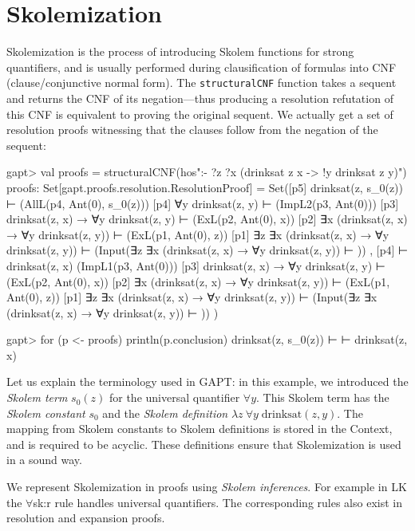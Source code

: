 \documentclass[a4paper,11pt]{book}
\begin{document}
\section{Skolemization}\label{secskolem}

Skolemization is the process of introducing Skolem functions for strong
quantifiers, and is usually performed during clausification of formulas into
CNF (clause/conjunctive normal form).  The \texttt{structuralCNF} function
takes a sequent and returns the CNF of its negation---thus producing a
resolution refutation of this CNF is equivalent to proving the original
sequent.  We actually get a set of resolution proofs witnessing that the
clauses follow from the negation of the sequent:
\begin{clilisting}
gapt> val proofs = structuralCNF(hos":- ?z ?x (drinksat z x -> !y drinksat z y)")
proofs: Set[gapt.proofs.resolution.ResolutionProof] =
Set([p5] drinksat(z, s_0(z)) ⊢    (AllL(p4, Ant(0), s_0(z)))
[p4] ∀y drinksat(z, y) ⊢    (ImpL2(p3, Ant(0)))
[p3] drinksat(z, x) → ∀y drinksat(z, y) ⊢    (ExL(p2, Ant(0), x))
[p2] ∃x (drinksat(z, x) → ∀y drinksat(z, y)) ⊢    (ExL(p1, Ant(0), z))
[p1] ∃z ∃x (drinksat(z, x) → ∀y drinksat(z, y)) ⊢    (Input(∃z ∃x (drinksat(z, x) → ∀y drinksat(z, y)) ⊢ ))
, [p4]  ⊢ drinksat(z, x)   (ImpL1(p3, Ant(0)))
[p3] drinksat(z, x) → ∀y drinksat(z, y) ⊢    (ExL(p2, Ant(0), x))
[p2] ∃x (drinksat(z, x) → ∀y drinksat(z, y)) ⊢    (ExL(p1, Ant(0), z))
[p1] ∃z ∃x (drinksat(z, x) → ∀y drinksat(z, y)) ⊢    (Input(∃z ∃x (drinksat(z, x) → ∀y drinksat(z, y)) ⊢ ))
)

gapt> for (p <- proofs) println(p.conclusion)
drinksat(z, s_0(z)) ⊢ 
 ⊢ drinksat(z, x)

\end{clilisting}

Let us explain the terminology used in GAPT: in this example, we introduced
the \emph{Skolem term} $s_0(z)$ for the universal quantifier $\forall y$.  This
Skolem term has the \emph{Skolem constant} $s_0$ and the \emph{Skolem
definition} $\lambda z\: \forall y\; \mathrm{drinksat}(z,y)$.  The mapping from
Skolem constants to Skolem definitions is stored in the Context, and is
required to be acyclic.  These definitions ensure that Skolemization is used in
a sound way.

We represent Skolemization in proofs using \emph{Skolem inferences}.  For
example in LK the $\forall$sk:r rule handles universal quantifiers.  The
corresponding rules also exist in resolution and expansion proofs.
\begin{prooftree}
\end{prooftree}
\end{document}
